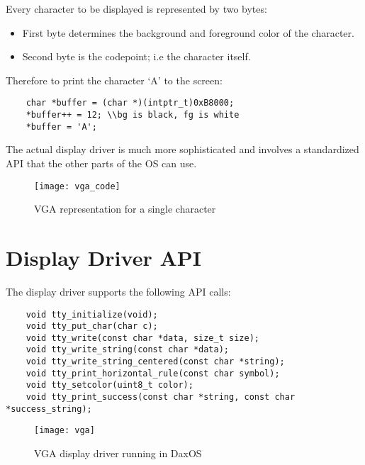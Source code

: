 Every character to be displayed is represented by two bytes:
\begin{itemize}
    \item First byte determines the background and foreground color of the character.
    \item Second byte is the codepoint; i.e the character itself. 
\end{itemize}

Therefore to print the character `A' to the screen:

\lstset{language=C}
\begin{lstlisting}
    char *buffer = (char *)(intptr_t)0xB8000;
    *buffer++ = 12; \\bg is black, fg is white
    *buffer = 'A';
\end{lstlisting}

The actual display driver is much more sophisticated and involves a standardized API that the other parts of the OS can use.
\vspace{1cm}
\begin{figure}[h!]
	\texttt{[image: vga\_code]}
	\caption{VGA representation for a single character}
\end{figure}
\pagebreak

\section{Display Driver API}\label{section:Display Driver API}
The display driver supports the following API calls:
\begin{lstlisting}
    void tty_initialize(void);
    void tty_put_char(char c);
    void tty_write(const char *data, size_t size);
    void tty_write_string(const char *data);
    void tty_write_string_centered(const char *string);
    void tty_print_horizontal_rule(const char symbol);
    void tty_setcolor(uint8_t color);
    void tty_print_success(const char *string, const char *success_string);
\end{lstlisting}

\vspace{1.5cm}
\begin{figure}[h!]
	\texttt{[image: vga]}
	\caption{VGA display driver running in DaxOS}
\end{figure}